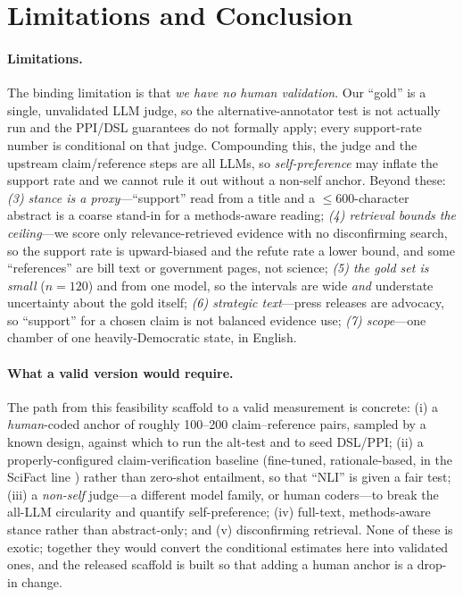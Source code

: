 \section{Limitations and Conclusion}
\label{sec:conclusion}

\paragraph{Limitations.} The binding limitation is that \emph{we have no human validation}. Our
``gold'' is a single, unvalidated LLM judge, so the alternative-annotator test
\citep{calderon2025alttest} is not actually run and the PPI/DSL guarantees
\citep{angelopoulos2023ppi,egami2023dsl} do not formally apply; every support-rate number is conditional
on that judge. Compounding this, the judge and the upstream claim/reference steps are all LLMs, so
\emph{self-preference} \citep{panickssery2024llm} may inflate the support rate and we cannot rule it out
without a non-self anchor. Beyond these: \emph{(3) stance is a proxy}---``support'' read from a title and
a ${\le}600$-character abstract is a coarse stand-in for a methods-aware reading; \emph{(4) retrieval
bounds the ceiling}---we score only relevance-retrieved evidence with no disconfirming search, so the
support rate is upward-biased and the refute rate a lower bound, and some ``references'' are bill text or
government pages, not science; \emph{(5) the gold set is small} ($n=120$) and from one model, so the
intervals are wide \emph{and} understate uncertainty about the gold itself; \emph{(6) strategic
text}---press releases are advocacy, so ``support'' for a chosen claim is not balanced evidence use;
\emph{(7) scope}---one chamber of one heavily-Democratic state, in English.

\paragraph{What a valid version would require.} The path from this feasibility scaffold to a valid
measurement is concrete: (i) a \emph{human}-coded anchor of roughly 100--200 claim--reference pairs,
sampled by a known design, against which to run the alt-test and to seed DSL/PPI; (ii) a
properly-configured claim-verification baseline (fine-tuned, rationale-based, in the SciFact line
\citep{wadden2020fact}) rather than zero-shot entailment, so that ``NLI'' is given a fair test; (iii) a
\emph{non-self} judge---a different model family, or human coders---to break the all-LLM circularity and
quantify self-preference; (iv) full-text, methods-aware stance rather than abstract-only; and (v)
disconfirming retrieval. None of these is exotic; together they would convert the conditional estimates
here into validated ones, and the released scaffold is built so that adding a human anchor is a drop-in
change.

